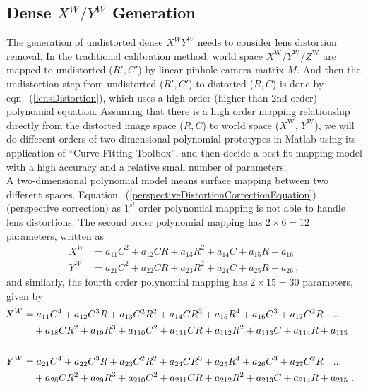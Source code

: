 \subsection{Dense \(X^W/Y^W\) Generation}
\indent
The generation of undistorted dense \(X^WY^W\) needs to consider lens distortion removal. In the traditional calibration method, world space \(X^\text{W}/Y^\text{W}/Z^\text{W}\) are mapped to undistorted (\(R', C'\)) by linear pinhole camera matrix \(M\). And then the undistortion step from undistorted (\(R', C'\)) to distorted (\(R, C\)) is done by eqn.~(\ref{lensDistortion}), which uses a high order (higher than 2nd order) polynomial equation. Assuming that there is a high order mapping relationship directly from the distorted image space (\(R, C\)) to world space (\(X^\text{W}, \, Y^\text{W}\)), we will do different orders of two-dimensional polynomial prototypes in Matlab using its application of \enquote{Curve Fitting Toolbox}, and then decide a best-fit mapping model with a high accuracy and a relative small number of parameters.
%
\\\indent
A two-dimensional polynomial model means surface mapping between two different spaces. Equation.~(\ref{perspectiveDistortionCorrectionEquation}) (perspective correction) as \(1^{st}\) order polynomial mapping is not able to handle lens distortions. 
%
The second order polynomial mapping has $2\times6=12$ parameters, written as %
%
\begin{equation}
\begin{aligned}
X^W &=  a_{11}C^2 + a_{12}CR + a_{13}R^2 + a_{14}C + a_{15}R + a_{16}
\\%
Y^W &=  a_{21}C^2 + a_{22}CR + a_{23}R^2 + a_{24}C + a_{25}R + a_{26} \, , 
\end{aligned}
\label{secondOrderPolynomial}
\end{equation}%
%
\noindent
and similarly, the fourth order polynomial mapping has $2\times15=30$ parameters, given by 
%
\begin{equation}
\hspace*{-0.3cm}%
\begin{aligned}
X^W &=  a_{11}C^4 + a_{12}C^3R + a_{13}C^2R^2 + a_{14}CR^3 + a_{15}R^4 + a_{16}C^3 + a_{17}C^2R \ \ \ ...\\%
&\,\,\,\,\,\,+ a_{18}CR^2 + a_{19}R^3 + a_{110}C^2 + a_{111}CR + a_{112}R^2 + a_{113}C + a_{114}R + a_{115}
\\\\%
Y^W &=  a_{21}C^4 + a_{22}C^3R + a_{23}C^2R^2 + a_{24}CR^3 + a_{25}R^4 + a_{26}C^3 + a_{27}C^2R \ \ \ ...\\%
&\,\,\,\,\,\,+ a_{28}CR^2 + a_{29}R^3 + a_{210}C^2 + a_{211}CR + a_{212}R^2 + a_{213}C + a_{214}R + a_{215}      \,\,.
\end{aligned}
\label{fourthOrderPolynomial}
\end{equation}%
